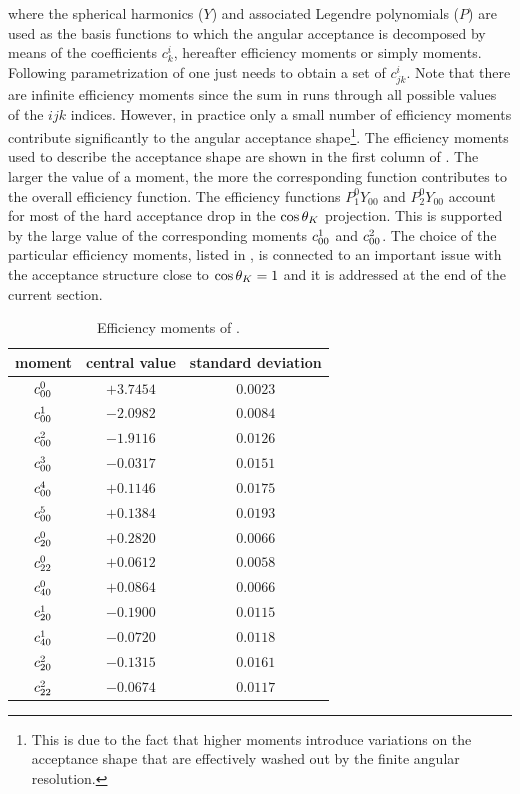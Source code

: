 \noindent where the spherical harmonics ($Y$) and associated Legendre polynomials ($P$) are used as the basis
functions to which the angular acceptance is decomposed by means of the coefficients $c^i_{k}$, hereafter efficiency moments or simply moments.
Following parametrization of  one just needs to obtain a set of $c^i_{jk}$. Note that there are infinite efficiency moments
since the sum in  runs through all possible values of the $ijk$ indices. However, in practice only a small number of efficiency moments
contribute significantly to the angular acceptance shape\footnote{This is due to the fact that higher moments introduce
variations on the acceptance shape that are effectively washed out by the finite angular resolution.}.
The efficiency moments used to describe the acceptance shape are shown in the first column of .
The larger the value of a moment, the more the corresponding function contributes to the overall efficiency function.
The efficiency functions $P_1^0Y_{00}$ and $P_2^0Y_{00}$ account for most of the hard acceptance drop in the $\cos\theta_{K}$ projection.
This is supported by the large value of the corresponding moments $c^{1}_{00}$ and $c^{2}_{00}$.
The choice of the particular efficiency moments, listed in , is connected to an important
issue with the acceptance structure close to $\cos\theta_{K}=1$ and it is addressed at the end of the current section.

\begin{table}[!t]
  \centering
  \renewcommand{\arraystretch}{1.2}
  \begin{tabular}{ccc}
    \hline
    moment & central value & standard deviation \\
    \hline
  $c^{0}_{00}$   & $+3.7454$  &  $0.0023$  \\
  $c^{1}_{00}$   & $-2.0982$  &  $0.0084$  \\
  $c^{2}_{00}$   & $-1.9116$  &  $0.0126$  \\
  $c^{3}_{00}$   & $-0.0317$  &  $0.0151$  \\
  $c^{4}_{00}$   & $+0.1146$  &  $0.0175$  \\
  $c^{5}_{00}$   & $+0.1384$  &  $0.0193$  \\
  $c^{0}_{20}$   & $+0.2820$  &  $0.0066$  \\
  $c^{0}_{22}$   & $+0.0612$  &  $0.0058$  \\
  $c^{0}_{40}$   & $+0.0864$  &  $0.0066$  \\
  $c^{1}_{20}$   & $-0.1900$  &  $0.0115$  \\
  $c^{1}_{40}$   & $-0.0720$  &  $0.0118$  \\
  $c^{2}_{20}$   & $-0.1315$  &  $0.0161$  \\
  $c^{2}_{22}$   & $-0.0674$  &  $0.0117$  \\
  \hline
  \end{tabular}
  \caption{Efficiency moments of \BsJpsiKst.}
   \label{eff_moms_table}
\end{table}

